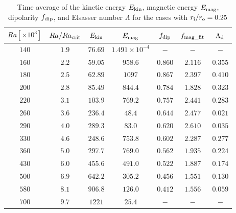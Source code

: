 \begin{table}
\begin{center}
\caption{Time average of the kinetic energy $E_{\rm kin}$, magnetic energy $E_{\rm mag}$, dipolarity $f_{\rm dip}$, and Elsasser number $\Lambda$ for the cases with $r_{\rm i}/r_{\rm o} = 0.25$}
  \begin{tabular}{ccccccc}
    \hline
     $Ra[\times 10^3]$  &  $Ra/Ra_{\rm crit}$&  $E_{\rm kin}$  &  $E_{\rm mag}$ & $f_{\rm dip}$ & $f_{\rm mag\_fit}$ & $\Lambda_{\rm d}$\\
    \hline \hline    
    $140$  & $1.9$ &  $76.69$ & $1.491 \times 10^{-4}$ & $-$ & $-$ & $-$\\
    $160$  & $2.2$ &  $59.05$ & $958.6$ & $0.860$ & $2.116$ & $0.355$\\
    $180$  & $2.5$ &  $62.89$ & $1097$ & $0.867$ & $2.397$ & $0.410$\\
    $200$  & $2.8$ &  $85.49$ & $844.4$ & $0.784$ & $1.828$ & $0.323$\\
    $220$  & $3.1$ &  $103.9$ & $769.2$ & $0.757$ & $2.441$ & $0.283$\\
    $260$  & $3.6$ &  $236.4$ & $48.4$ & $0.644$ & $2.477$ & $0.021$\\
    $290$  & $4.0$ &  $289.3$ & $83.0$ & $0.620$ & $2.610$ & $0.035$\\
    $330$  & $4.6$ &  $248.6$ & $753.8$ & $0.602$ & $2.287$ & $0.277$\\
    $360$  & $5.0$ &  $297.7$ & $769.0$ & $0.562$ & $1.935$ & $0.224$\\
    $430$  & $6.0$ &  $455.6$ & $491.0$ & $0.522$ & $1.887$ & $0.174$\\
    $500$  & $6.9$ &  $642.2$ & $305.2$ & $0.456$ & $1.551$ & $0.130$\\
    $580$  & $8.1$ &  $906.8$ & $126.0$ & $0.412$ & $1.556$ & $0.059$\\
    $700$  & $9.7$ &  $1221$ & $25.4$ & $-$ & $-$ & $-$\\
    \hline
  \end{tabular}
 \end{center}
 \label{table:Summary_25}
\end{table}
 
